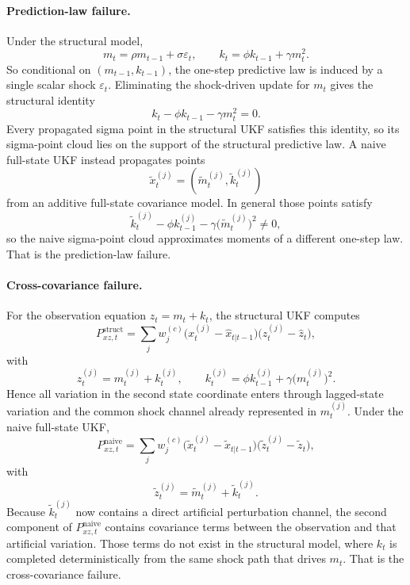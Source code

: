 \paragraph{Prediction-law failure.}
Under the structural model,
\[
  m_t = \rho m_{t-1} + \sigma \varepsilon_t,
  \qquad
  k_t = \phi k_{t-1} + \gamma m_t^2.
\]
So conditional on $(m_{t-1},k_{t-1})$, the one-step predictive law is induced by
a single scalar shock $\varepsilon_t$.  Eliminating the shock-driven update for
$m_t$ gives the structural identity
\begin{equation}
  k_t - \phi k_{t-1} - \gamma m_t^2 = 0.
  \label{eq:bf-ukf-structural-identity}
\end{equation}
Every propagated sigma point in the structural UKF satisfies this identity, so
its sigma-point cloud lies on the support of the structural predictive law.  A
naive full-state UKF instead propagates points
\[
  \tilde x_t^{(j)}=(\tilde m_t^{(j)},\tilde k_t^{(j)})
\]
from an additive full-state covariance model.  In general those points satisfy
\[
  \tilde k_t^{(j)} - \phi k_{t-1}^{(j)} - \gamma \bigl(\tilde m_t^{(j)}\bigr)^2
  \neq 0,
\]
so the naive sigma-point cloud approximates moments of a different one-step law.
That is the prediction-law failure.

\paragraph{Cross-covariance failure.}
For the observation equation $z_t=m_t+k_t$, the structural UKF computes
\[
  P_{xz,t}^{\mathrm{struct}}
  =
  \sum_j w_j^{(c)}
  \bigl(x_t^{(j)}-\hat x_{t|t-1}\bigr)
  \bigl(z_t^{(j)}-\hat z_t\bigr),
\]
with
\[
  z_t^{(j)} = m_t^{(j)} + k_t^{(j)},
  \qquad
  k_t^{(j)} = \phi k_{t-1}^{(j)} + \gamma \bigl(m_t^{(j)}\bigr)^2.
\]
Hence all variation in the second state coordinate enters through lagged-state
variation and the common shock channel already represented in $m_t^{(j)}$.
Under the naive full-state UKF,
\[
  P_{xz,t}^{\mathrm{naive}}
  =
  \sum_j w_j^{(c)}
  \bigl(\tilde x_t^{(j)}-\tilde x_{t|t-1}\bigr)
  \bigl(\tilde z_t^{(j)}-\tilde z_t\bigr),
\]
with
\[
  \tilde z_t^{(j)} = \tilde m_t^{(j)} + \tilde k_t^{(j)}.
\]
Because $\tilde k_t^{(j)}$ now contains a direct artificial perturbation channel,
the second component of $P_{xz,t}^{\mathrm{naive}}$ contains covariance terms
between the observation and that artificial variation.  Those terms do not exist
in the structural model, where $k_t$ is completed deterministically from the
same shock path that drives $m_t$.  That is the cross-covariance failure.

